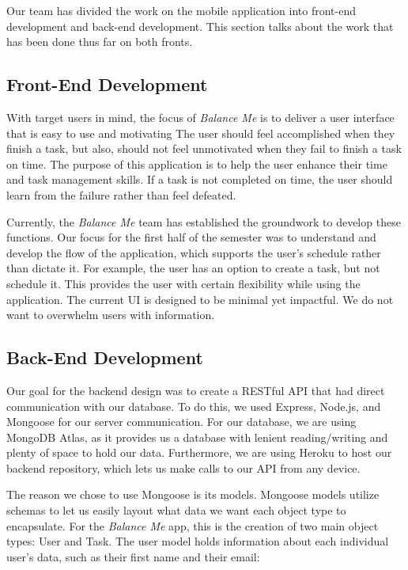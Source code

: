 \documentclass{sigchi}
\begin{document}
Our team has divided the work on the mobile application into front-end
development and back-end development. This section talks about the work that
has been done thus far on both fronts.

\subsection{Front-End Development}

With target users in mind, the focus of \textit{Balance Me} is to deliver a
user interface that is easy to use and motivating The user should feel
accomplished when they finish a task, but also, should not feel unmotivated
when they fail to finish a task on time. The purpose of this application is to
help the user enhance their time and task management skills. If a task is not
completed on time, the user should learn from the failure rather than feel
defeated.

Currently, the \textit{Balance Me} team has established the groundwork to
develop these functions. Our focus for the first half of the semester was to
understand and develop the flow of the application, which supports the user’s
schedule rather than dictate it. For example, the user has an option to create a
task, but not schedule it. This provides the user with certain flexibility
while using the application. The current UI is designed to be minimal yet
impactful. We do not want to overwhelm users with information.


\subsection{Back-End Development}

Our goal for the backend design was to create a RESTful API that had direct
communication with our database. To do this, we used Express, Node.js, and
Mongoose for our server communication. For our database, we are using MongoDB
Atlas, as it provides us a database with lenient reading/writing and plenty of
space to hold our data. Furthermore, we are using Heroku to host our backend
repository, which lets us make calls to our API from any device.

The reason we chose to use Mongoose is its models. Mongoose models utilize
schemas to let us easily layout what data we want each object type to
encapsulate. For the \textit{Balance Me} app, this is the creation of two main
object types: User and Task. The user model holds information about each
individual user’s data, such as their first name and their email:
\end{document}
